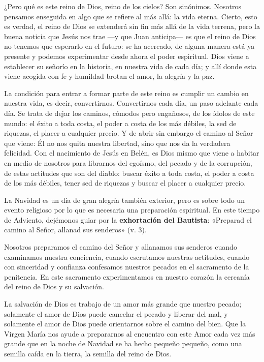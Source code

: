 \documentclass[]{article}
\begin{document}
¿Pero qué es este reino de Dios, reino de los cielos? Son sinónimos.
Nosotros pensamos enseguida en algo que se refiere al más allá: la vida
eterna. Cierto, esto es verdad, el reino de Dios se extenderá sin fin
más allá de la vida terrena, pero la buena noticia que Jesús nos trae
---y que Juan anticipa--- es que el reino de Dios no tenemos que
esperarlo en el futuro: se ha acercado, de alguna manera está ya
presente y podemos experimentar desde ahora el poder espiritual. Dios
viene a establecer su señorío en la historia, en nuestra vida de cada
día; y allí donde esta viene acogida con fe y humildad brotan el amor,
la alegría y la paz.

La condición para entrar a formar parte de este reino es cumplir un
cambio en nuestra vida, es decir, convertirnos. Convertirnos cada día,
un paso adelante cada día. Se trata de dejar los caminos, cómodos pero
engañosos, de los ídolos de este mundo: el éxito a toda costa, el poder
a costa de los más débiles, la sed de riquezas, el placer a cualquier
precio. Y de abrir sin embargo el camino al Señor que viene: Él no nos
quita nuestra libertad, sino que nos da la verdadera felicidad. Con el
nacimiento de Jesús en Belén, es Dios mismo que viene a habitar en medio
de nosotros para librarnos del egoísmo, del pecado y de la corrupción,
de estas actitudes que son del diablo: buscar éxito a toda costa, el
poder a costa de los más débiles, tener sed de riquezas y buscar el
placer a cualquier precio.

La Navidad es un día de gran alegría también exterior, pero es sobre
todo un evento religioso por lo que es necesaria una preparación
espiritual. En este tiempo de Adviento, dejémonos guiar por la
\textbf{exhortación del Bautista}: «Preparad el camino al Señor, allanad
sus senderos» (v. 3).

Nosotros preparamos el camino del Señor y allanamos sus senderos cuando
examinamos nuestra conciencia, cuando escrutamos nuestras actitudes,
cuando con sinceridad y confianza confesamos nuestros pecados en el
sacramento de la penitencia. En este sacramento experimentamos en
nuestro corazón la cercanía del reino de Dios y su salvación.

La salvación de Dios es trabajo de un amor más grande que nuestro
pecado; solamente el amor de Dios puede cancelar el pecado y liberar del
mal, y solamente el amor de Dios puede orientarnos sobre el camino del
bien. Que la Virgen María nos ayude a prepararnos al encuentro con este
Amor cada vez más grande que en la noche de Navidad se ha hecho pequeño
pequeño, como una semilla caída en la tierra, la semilla del reino de
Dios.
\end{document}
